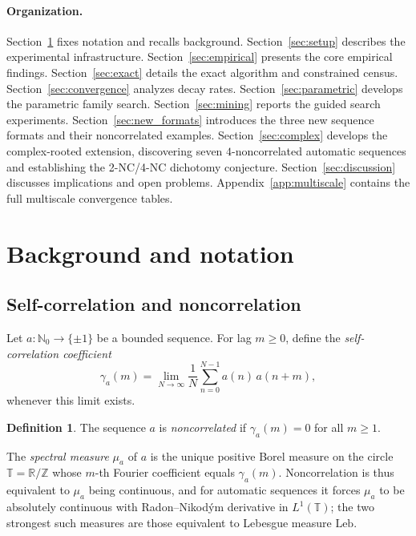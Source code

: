\documentclass[11pt]{article}
\theoremstyle{definition}
\newtheorem{definition}[theorem]{Definition}
\newcommand{\Leb}{\mathrm{Leb}}
\newcommand{\Z}{\mathbb{Z}}
\newcommand{\N}{\mathbb{N}}
\newcommand{\T}{\mathbb{T}}
\newcommand{\R}{\mathbb{R}}
\begin{document}
\paragraph{Organization.}
Section~\ref{sec:background} fixes notation and recalls background.
Section~\ref{sec:setup} describes the experimental infrastructure.
Section~\ref{sec:empirical} presents the core empirical findings.
Section~\ref{sec:exact} details the exact algorithm and constrained census.
Section~\ref{sec:convergence} analyzes decay rates.
Section~\ref{sec:parametric} develops the parametric family search.
Section~\ref{sec:mining} reports the guided search experiments.
Section~\ref{sec:new_formats} introduces the three new sequence formats
and their noncorrelated examples.
Section~\ref{sec:complex} develops the complex-rooted extension,
discovering seven $4$-noncorrelated automatic sequences and establishing
the 2-NC/4-NC dichotomy conjecture.
Section~\ref{sec:discussion} discusses implications and open problems.
Appendix~\ref{app:multiscale} contains the full multiscale convergence tables.

\section{Background and notation}
\label{sec:background}

\subsection{Self-correlation and noncorrelation}

Let $a : \N_0 \to \{\pm 1\}$ be a bounded sequence. For lag $m \geq 0$,
define the \emph{self-correlation coefficient}
\[
    \gamma_a(m)
    = \lim_{N \to \infty}
      \frac{1}{N} \sum_{n=0}^{N-1} a(n)\,a(n+m),
\]
whenever this limit exists.

\begin{definition}
The sequence $a$ is \emph{noncorrelated} if $\gamma_a(m) = 0$
for all $m \geq 1$.
\end{definition}

The \emph{spectral measure} $\mu_a$ of $a$ is the unique positive Borel
measure on the circle $\T = \R/\Z$ whose $m$-th Fourier coefficient
equals $\gamma_a(m)$. Noncorrelation is thus equivalent to $\mu_a$
being continuous, and for automatic sequences it forces $\mu_a$ to be
absolutely continuous with Radon--Nikod\'ym derivative in $L^1(\T)$;
the two strongest such measures are those equivalent to Lebesgue measure
$\Leb$.
\end{document}
